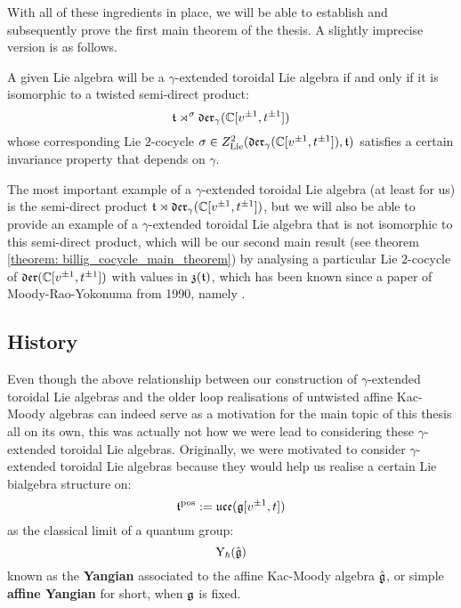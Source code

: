         With all of these ingredients in place, we will be able to establish and subsequently prove the first main theorem of the thesis. A slightly imprecise version is as follows.
        \begin{theorem}
            A given Lie algebra will be a $\gamma$-extended toroidal Lie algebra if and only if it is isomorphic to a twisted semi-direct product:
                $$\mathfrak{t} \rtimes^{\sigma} \mathfrak{der}_{\gamma}(\mathbb{C}[v^{\pm 1}, t^{\pm 1}])$$
            whose corresponding Lie $2$-cocycle $\sigma \in Z^2_{\mathrm{Lie}}(\mathfrak{der}_{\gamma}(\mathbb{C}[v^{\pm 1}, t^{\pm 1}]), \mathfrak{t})$ satisfies a certain invariance property that depends on $\gamma$.
        \end{theorem}

        The most important example of a $\gamma$-extended toroidal Lie algebra (at least for us) is the semi-direct product $\mathfrak{t} \rtimes \mathfrak{der}_{\gamma}(\mathbb{C}[v^{\pm 1}, t^{\pm 1}])$, but we will also be able to provide an example of a $\gamma$-extended toroidal Lie algebra that is not isomorphic to this semi-direct product, which will be our second main result (see theorem \ref{theorem: billig_cocycle_main_theorem}) by analysing a particular Lie $2$-cocycle of $\mathfrak{der}(\mathbb{C}[v^{\pm 1}, t^{\pm 1}])$ with values in $\mathfrak{z}(\mathfrak{t})$, which has been known since a paper of Moody-Rao-Yokonuma from 1990, namely \cite{moody_rao_yokonuma_vertex_representations_of_toroidal_lie_algebras}.

    \subsection{History} \label{subsection: history}
        Even though the above relationship between our construction of $\gamma$-extended toroidal Lie algebras and the older loop realisations of untwisted affine Kac-Moody algebras can indeed serve as a motivation for the main topic of this thesis all on its own, this was actually not how we were lead to considering these $\gamma$-extended toroidal Lie algebras. Originally, we were motivated to consider $\gamma$-extended toroidal Lie algebras because they would help us realise a certain Lie bialgebra structure on:
            $$\mathfrak{t}^{\mathrm{pos}} := \mathfrak{uce}(\mathfrak{g}[v^{\pm 1}, t])$$
        as the classical limit of a quantum group:
            $$\mathrm{Y}_{\hbar}(\hat{\mathfrak{g}})$$
        known as the \textbf{Yangian} associated to the affine Kac-Moody algebra $\hat{\mathfrak{g}}$, or simple  \textbf{affine Yangian} for short, when $\mathfrak{g}$ is fixed.
        
